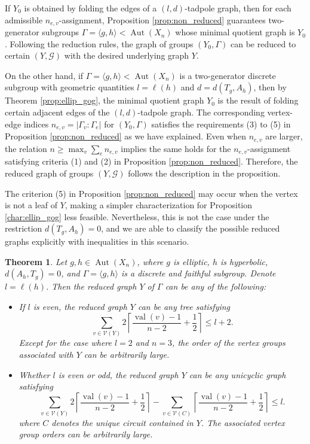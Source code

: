 \documentclass[12pt,leqno]{amsart}
\makeatletter
\renewenvironment{proof}[1][\proofname]{%
	\par
	\pushQED{\qed}%
	\normalfont
	\topsep6\p@\@plus6\p@\relax
	\trivlist
	\item[\hskip\labelsep\itshape #1\@addpunct{.}]%
	\ignorespaces
}{%
	\par\nobreak\vspace{2pt}%
	\popQED%
	\medskip%
	\endtrivlist
	\@endpefalse
}
\newcommand{\2}{L^2_{\rm per}(0, T)}
\newtheorem{thm}{Theorem}[section]
\newcommand{\aut}{{\operatorname{Aut}}}
\newcommand{\val}{{\operatorname{val}}}
\numberwithin{equation}{section}
\numberwithin{figure}{section}
\makeatother
\begin{document}
\begin{proof}
    If $Y_0$ is obtained by folding the edges of a $(l,d)$-tadpole graph, then for each admissible $n_{e,v}$-assignment, Proposition \ref{prop:non_reduced} guarantees two-generator subgroups $\Gamma = \langle g,h\rangle< \aut(X_n)$ whose minimal quotient graph is $Y_0$. Following the reduction rules, the graph of groups $(Y_0,\Gamma)$ can be reduced to certain $(Y,\mathcal{G})$ with the desired underlying graph $Y$.

    On the other hand, if $\Gamma = \langle g,h\rangle< \aut(X_n)$ is a two-generator discrete subgroup with geometric quantities $l = \ell(h)$ and $d = d(T_g,A_h)$, then by Theorem \ref{prop:ellip_gog}, the minimal quotient graph $Y_0$ is the result of folding certain adjacent edges of the $(l,d)$-tadpole graph. The corresponding vertex-edge indices $n_{e,v} = \lvert \Gamma_v:\Gamma_e\rvert$ for $(Y_0,\Gamma)$ satisfies the requirements (3) to (5) in Proposition \ref{prop:non_reduced} as we have explained. Even when $n_{e,v}$ are larger, the relation $n\geq \max_v\sum_e n_{e,v}$ implies the same holds for the $n_{e,v}$-assignment satisfying criteria (1) and (2) in Proposition \ref{prop:non_reduced}. Therefore, the reduced graph of groups $(Y,\mathcal{G})$ follows the description in the proposition.
\end{proof}
The criterion (5) in Proposition \ref{prop:non_reduced} may occur when the vertex is not a leaf of $Y$, making a simpler characterization for Proposition \ref{char:ellip_gog} less feasible. Nevertheless, this is not the case under the restriction $d(T_g,A_h) = 0$, and we are able to classify the possible reduced graphs explicitly with inequalities in this scenario.
\begin{thm}
    Let $g,h\in \aut(X_n)$, where $g$ is elliptic, $h$ is hyperbolic, $d(A_h,T_g) = 0$, and $\Gamma = \langle g,h\rangle$ is a discrete and faithful subgroup. Denote $l = \ell(h)$. Then the reduced graph $Y$ of $\Gamma$ can be any of the following:
    \begin{itemize}
        \item If $l$ is even, the reduced graph $Y$ can be any tree satisfying
        \[
        \sum_{v\in\mathcal{V}(Y)}2\left\lceil\frac{\val(v)-1}{n-2}+\frac{1}{2}\right\rceil \leq l+2.
        \]
        Except for the case where $l=2$ and $n=3$, the order of the vertex groups associated with $Y$ can be arbitrarily large.
        \item Whether $l$ is even or odd, the reduced graph $Y$ can be any unicyclic graph satisfying
        \[
        \sum_{v\in\mathcal{V}(Y)}2\left\lceil\frac{\val(v)-1}{n-2}+\frac{1}{2}\right\rceil - \sum_{v\in\mathcal{V}(C)}\left\lceil\frac{\val(v)-1}{n-2}+\frac{1}{2}\right\rceil \leq l.
        \]
        where $C$ denotes the unique circuit contained in $Y$. The associated vertex group orders can be arbitrarily large.
    \end{itemize}
\end{thm}
\end{document}
